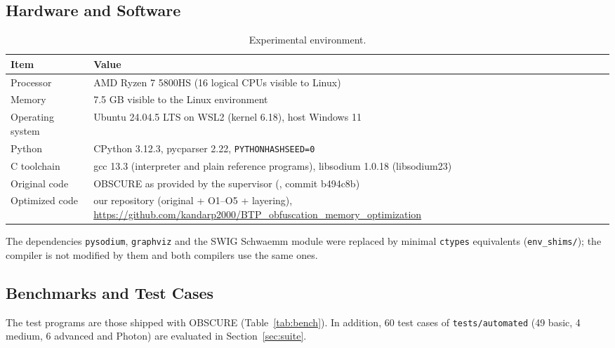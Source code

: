 \documentclass[12pt,a4paper,oneside]{report}
\newcommand{\code}[1]{\texttt{#1}}
\begin{document}
\subsection{Hardware and Software}
\begin{table}[H]
\centering\small
\caption{Experimental environment.}
\label{tab:env}
\begin{tabularx}{\textwidth}{@{}l X@{}}
\toprule
Item & Value\\ \midrule
Processor & AMD Ryzen 7 5800HS (16 logical CPUs visible to Linux)\\
Memory & 7.5 GB visible to the Linux environment\\
Operating system & Ubuntu 24.04.5 LTS on WSL2 (kernel 6.18), host Windows 11\\
Python & CPython 3.12.3, pycparser 2.22, \code{PYTHONHASHSEED=0}\\
C toolchain & gcc 13.3 (interpreter and plain reference programs), libsodium 1.0.18 (libsodium23)\\
Original code & OBSCURE as provided by the supervisor (\cite{obscuregit}, commit b494c8b)\\
Optimized code & our repository (original + O1--O5 + layering), \url{https://github.com/kandarp2000/BTP_obfuscation_memory_optimization}\\
\bottomrule
\end{tabularx}
\end{table}
The dependencies \code{pysodium}, \code{graphviz} and the SWIG Schwaemm module were replaced by
minimal \code{ctypes} equivalents (\code{env\_shims/}); the compiler is not modified by them and
both compilers use the same ones.

\subsection{Benchmarks and Test Cases}
The test programs are those shipped with OBSCURE (Table~\ref{tab:bench}). In addition, 60 test cases
of \code{tests/automated} (49 basic, 4 medium, 6 advanced and Photon) are evaluated in
Section~\ref{sec:suite}.
\end{document}
